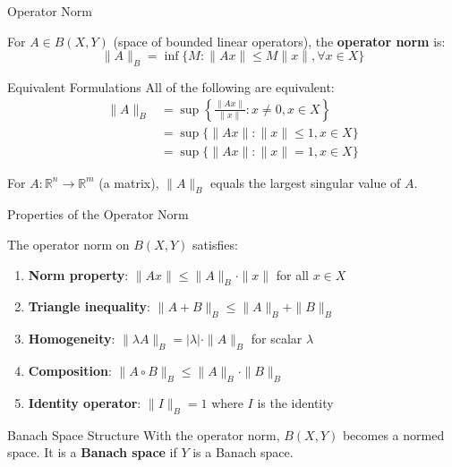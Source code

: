 \documentclass[aspectratio=169,10pt]{beamer}
\begin{document}
\begin{frame}{Operator Norm}
    \begin{definition}
        For $A \in B(X,Y)$ (space of bounded linear operators), the \textbf{operator norm} is:
        $$\|A\|_B = \inf\{M : \|Ax\| \leq M\|x\|, \forall x \in X\}$$
    \end{definition}

    \vspace{0.3cm}

    \begin{block}{Equivalent Formulations}
        All of the following are equivalent:
        \begin{align*}
            \|A\|_B &= \sup\left\{\frac{\|Ax\|}{\|x\|} : x \neq 0, x \in X\right\} \\
            &= \sup\{\|Ax\| : \|x\| \leq 1, x \in X\} \\
            &= \sup\{\|Ax\| : \|x\| = 1, x \in X\}
        \end{align*}
    \end{block}

    \vspace{0.3cm}

    \begin{example}
        For $A : \mathbb{R}^n \to \mathbb{R}^m$ (a matrix), $\|A\|_B$ equals the largest singular value of $A$.
    \end{example}
\end{frame}

\begin{frame}{Properties of the Operator Norm}
    \begin{theorem}
        The operator norm on $B(X,Y)$ satisfies:
    \end{theorem}

    \begin{enumerate}
        \item \textbf{Norm property}: $\|Ax\| \leq \|A\|_B \cdot \|x\|$ for all $x \in X$

        \item \textbf{Triangle inequality}: $\|A + B\|_B \leq \|A\|_B + \|B\|_B$

        \item \textbf{Homogeneity}: $\|\lambda A\|_B = |\lambda| \cdot \|A\|_B$ for scalar $\lambda$

        \item \textbf{Composition}: $\|A \circ B\|_B \leq \|A\|_B \cdot \|B\|_B$

        \item \textbf{Identity operator}: $\|I\|_B = 1$ where $I$ is the identity
    \end{enumerate}

    \vspace{0.5cm}

    \begin{block}{Banach Space Structure}
        With the operator norm, $B(X,Y)$ becomes a normed space. It is a \textbf{Banach space} if $Y$ is a Banach space.
    \end{block}
\end{frame}
\end{document}

